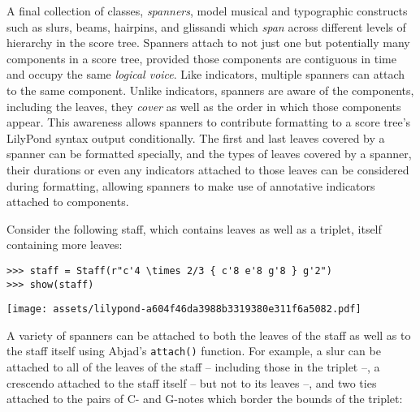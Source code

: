 A final collection of classes, \emph{spanners}, model musical and typographic
constructs such as slurs, beams, hairpins, and glissandi which \emph{span}
across different levels of hierarchy in the score tree. Spanners attach to not
just one but potentially many components in a score tree, provided those
components are contiguous in time and occupy the same \emph{logical voice}.
Like indicators, multiple spanners can attach to the same component. Unlike
indicators, spanners are aware of the components, including the leaves, they
\emph{cover} as well as the order in which those components appear. This
awareness allows spanners to contribute formatting to a score tree's LilyPond
syntax output conditionally. The first and last leaves covered by a spanner can
be formatted specially, and the types of leaves covered by a spanner, their
durations or even any indicators attached to those leaves can be considered
during formatting, allowing spanners to make use of annotative indicators
attached to components.

Consider the following staff, which contains leaves as well as a triplet,
itself containing more leaves:

\begin{comment}
<abjad>
staff = Staff(r"c'4 \times 2/3 { c'8 e'8 g'8 } g'2")
show(staff)
</abjad>
\end{comment}

\begin{abjadbookoutput}
\begin{singlespacing}
\vspace{-0.5\baselineskip}
\begin{verbatim}
>>> staff = Staff(r"c'4 \times 2/3 { c'8 e'8 g'8 } g'2")
>>> show(staff)
\end{verbatim}
\noindent\texttt{[image: assets/lilypond-a604f46da3988b3319380e311f6a5082.pdf]}
\end{singlespacing}
\end{abjadbookoutput}

\noindent A variety of spanners can be attached to both the leaves of the staff
as well as to the staff itself using Abjad's \texttt{attach()} function. For
example, a slur can be attached to all of the leaves of the staff -- including
those in the triplet --, a crescendo attached to the staff itself -- but not to
its leaves --, and two ties attached to the pairs of C- and G-notes which
border the bounds of the triplet:

\begin{comment}
<abjad>
slur = Slur()
crescendo = Crescendo()
tie_one = Tie()
tie_two = Tie()
leaves = staff.select_leaves()
attach(slur, leaves)
attach(crescendo, staff)
attach(tie_one, leaves[:2])
attach(tie_two, leaves[-2:])
show(staff)
</abjad>
\end{comment}

